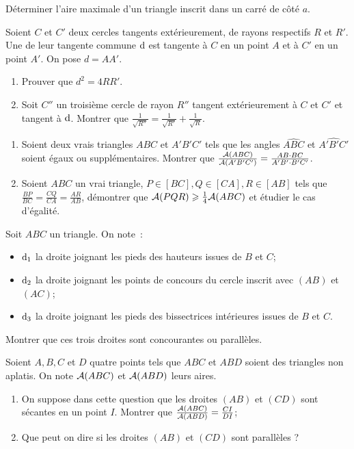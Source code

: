 \begin{exercice}
    Déterminer l'aire maximale d'un triangle inscrit dans un carré de côté \(a\).
\end{exercice}
\begin{exercice}
    Soient \(C\) et \(C'\) deux cercles tangents extérieurement, de rayons respectifs \(R\) et \(R'\). Une de leur tangente commune \(\mathrm{d}\) est tangente à \(C\) en un point \(A\) et à \(C'\) en un point \(A'\). On pose \(d=AA'\).
    \begin{enumerate}
        \item Prouver que \(d^2 = 4RR'\).
        \item Soit \(C''\) un troisième cercle de rayon \(R''\) tangent extérieurement à \(C\) et \(C'\) et tangent à \(\mathrm{d}\). Montrer que \(\frac{1}{\sqrt{R''}} = \frac{1}{\sqrt{R'}} + \frac{1}{\sqrt{R}}\).
    \end{enumerate}
\end{exercice}
\begin{exercice}
    \begin{enumerate}
    \item Soient deux vrais triangles \(ABC\) et \(A'B'C'\) tels que les angles \(\widehat{ABC}\) et \(\widehat{A'B'C'}\) soient égaux ou supplémentaires. Montrer que \(\frac{\mathcal{A}(ABC)}{\mathcal{A}(A'B'C')} = \frac{AB \cdot BC}{A'B' \cdot B'C'}\).
    \item Soient \(ABC\) un vrai triangle, \(P \in [BC], Q \in [CA], R \in [AB]\) tels que \(\frac{BP}{BC} = \frac{CQ}{CA} = \frac{AR}{AB}\), démontrer que \(\mathcal{A}(PQR) \geqslant \frac{1}{4} \mathcal{A}(ABC)\) et étudier le cas d'égalité.
    \end{enumerate}
\end{exercice}
\begin{exercice}
    Soit \(ABC\) un triangle. On note~:
    \begin{itemize}
        \item \(\mathrm{d}_1\) la droite joignant les pieds des hauteurs issues de \(B\) et \(C\);
        \item \(\mathrm{d}_2\) la droite joignant les points de concours du cercle inscrit avec \((AB)\) et \((AC)\);
        \item \(\mathrm{d}_3\) la droite joignant les pieds des bissectrices intérieures issues de \(B\) et \(C\).
    \end{itemize}
    Montrer que ces trois droites sont concourantes ou parallèles.
\end{exercice}
\begin{exercice}
    Soient \(A, B, C\) et \(D\) quatre points tels que \(ABC\) et \(ABD\) soient des triangles non aplatis. On note \(\mathcal{A}(ABC)\) et \(\mathcal{A}(ABD)\) leurs aires.
    \begin{enumerate}
        \item On suppose dans cette question que les droites \((AB)\) et \((CD)\) sont sécantes en un point \(I\). Montrer que \(\frac{\mathcal{A}(ABC)}{\mathcal{A}(ABD)} = \frac{CI}{DI}\);
        \item Que peut on dire si les droites \((AB)\) et \((CD)\) sont parallèles ?
    \end{enumerate}
\end{exercice}
